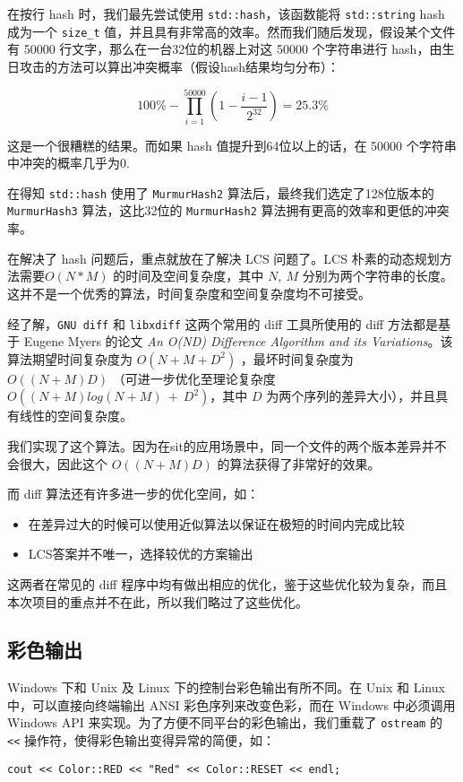 在按行 hash 时，我们最先尝试使用 \texttt{std::hash}，该函数能将
\texttt{std::string} hash 成为一个 \texttt{size\_t}
值，并且具有非常高的效率。然而我们随后发现，假设某个文件有 50000
行文字，那么在一台32位的机器上对这 50000 个字符串进行
hash，由生日攻击的方法可以算出冲突概率（假设hash结果均匀分布）：

\[
100\%-\prod _{i=1}^{50000} \left(1-\frac{i-1}{2^{32}}\right) = 25.3 \%
\]

这是一个很糟糕的结果。而如果 hash 值提升到64位以上的话，在 50000
个字符串中冲突的概率几乎为0.

在得知 \texttt{std::hash} 使用了 \texttt{MurmurHash2}
算法后，最终我们选定了128位版本的 \texttt{MurmurHash3} 算法，这比32位的
\texttt{MurmurHash2} 算法拥有更高的效率和更低的冲突率。

在解决了 hash 问题后，重点就放在了解决 LCS 问题了。LCS
朴素的动态规划方法需要$O(N*M)$ 的时间及空间复杂度，其中
$N,\ M$
分别为两个字符串的长度。这并不是一个优秀的算法，时间复杂度和空间复杂度均不可接受。

经了解，\texttt{GNU\ diff} 和 \texttt{libxdiff} 这两个常用的 diff
工具所使用的 diff 方法都是基于 Eugene Myers 的论文 \emph{An O(ND)
Difference Algorithm and its Variations}。该算法期望时间复杂度为
$O(N+M+D^2)$ ，最坏时间复杂度为 $O((N+M)D)$
（可进一步优化至理论复杂度 $O((N+M)log(N+M)\ +\ D^2)$，其中
$D$ 为两个序列的差异大小），并且具有线性的空间复杂度。

我们实现了这个算法。因为在sit的应用场景中，同一个文件的两个版本差异并不会很大，因此这个
$O((N+M)D)$ 的算法获得了非常好的效果。

而 diff 算法还有许多进一步的优化空间，如：

\begin{itemize}
\item
  在差异过大的时候可以使用近似算法以保证在极短的时间内完成比较
\item
  LCS答案并不唯一，选择较优的方案输出
\end{itemize}

这两者在常见的 diff
程序中均有做出相应的优化，鉴于这些优化较为复杂，而且本次项目的重点并不在此，所以我们略过了这些优化。

\subsection{彩色输出}

Windows 下和 Unix 及 Linux 下的控制台彩色输出有所不同。在 Unix 和 Linux
中，可以直接向终端输出 ANSI 彩色序列来改变色彩，而在 Windows 中必须调用
Windows API 来实现。为了方便不同平台的彩色输出，我们重载了
\texttt{ostream} 的 \texttt{\textless{}\textless{}}
操作符，使得彩色输出变得异常的简便，如：

\begin{lstlisting}
cout << Color::RED << "Red" << Color::RESET << endl;
\end{lstlisting}
